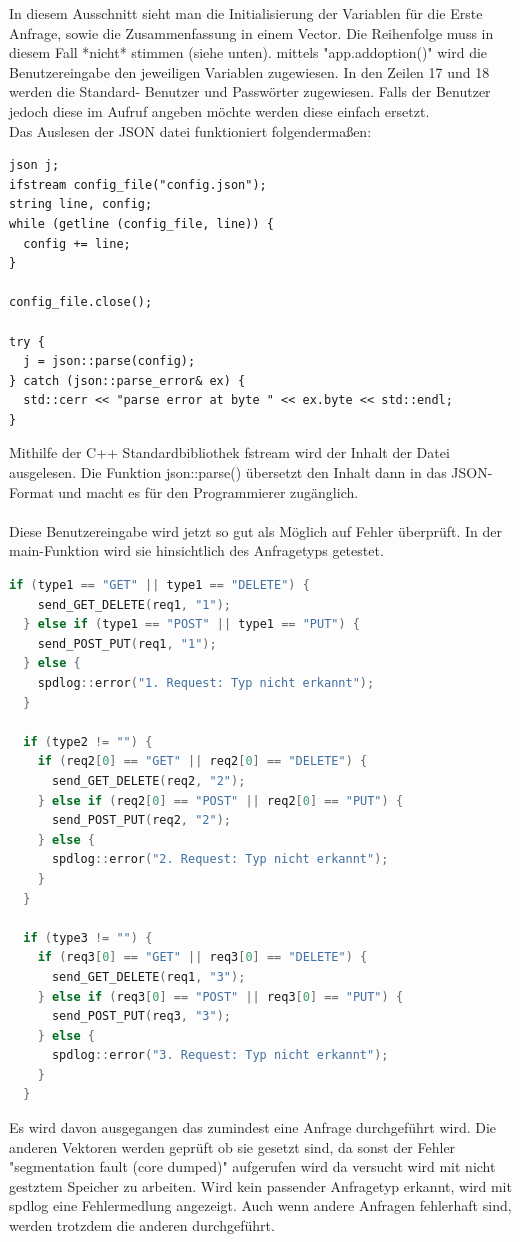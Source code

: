 \documentclass{article}
\begin{document}
In diesem Ausschnitt sieht man die Initialisierung der Variablen für die Erste Anfrage, sowie die Zusammenfassung in einem Vector.  Die Reihenfolge muss in diesem Fall *nicht* stimmen (siehe unten). mittels "app.add\textunderscore option()" wird die Benutzereingabe den jeweiligen Variablen zugewiesen. In den Zeilen 17 und 18 werden die Standard- Benutzer und Passwörter zugewiesen. Falls der Benutzer jedoch diese im Aufruf angeben möchte werden diese einfach ersetzt.
\\
Das Auslesen der JSON datei funktioniert folgendermaßen:
\begin{lstlisting}[language=C+]
json j;
ifstream config_file("config.json");
string line, config;
while (getline (config_file, line)) {
  config += line;
}

config_file.close();

try { 
  j = json::parse(config);
} catch (json::parse_error& ex) {
  std::cerr << "parse error at byte " << ex.byte << std::endl;
}
\end{lstlisting}
Mithilfe der C++ Standardbibliothek fstream wird der Inhalt der Datei ausgelesen. Die Funktion json::parse() übersetzt den Inhalt dann in das JSON-Format und macht es für den Programmierer zugänglich. 
\\
\\
Diese Benutzereingabe wird jetzt so gut als Möglich auf Fehler überprüft. In der main-Funktion wird sie hinsichtlich des Anfragetyps getestet.
\begin{lstlisting}[language=C++]
if (type1 == "GET" || type1 == "DELETE") {
    send_GET_DELETE(req1, "1");
  } else if (type1 == "POST" || type1 == "PUT") {
    send_POST_PUT(req1, "1");
  } else {
    spdlog::error("1. Request: Typ nicht erkannt");
  }

  if (type2 != "") {
    if (req2[0] == "GET" || req2[0] == "DELETE") {
      send_GET_DELETE(req2, "2");
    } else if (req2[0] == "POST" || req2[0] == "PUT") {
      send_POST_PUT(req2, "2");
    } else {
      spdlog::error("2. Request: Typ nicht erkannt");
    }
  }

  if (type3 != "") {
    if (req3[0] == "GET" || req3[0] == "DELETE") {
      send_GET_DELETE(req1, "3");
    } else if (req3[0] == "POST" || req3[0] == "PUT") {
      send_POST_PUT(req3, "3");
    } else {
      spdlog::error("3. Request: Typ nicht erkannt");
    }
  }
\end{lstlisting}
Es wird davon ausgegangen das zumindest eine Anfrage durchgeführt wird. Die anderen Vektoren werden geprüft ob sie gesetzt sind, da sonst der Fehler "segmentation fault (core dumped)" aufgerufen wird da versucht wird mit nicht gestztem Speicher zu arbeiten. Wird kein passender Anfragetyp erkannt, wird mit spdlog eine Fehlermedlung angezeigt. Auch wenn andere Anfragen fehlerhaft sind, werden trotzdem die anderen durchgeführt.
\end{document}
